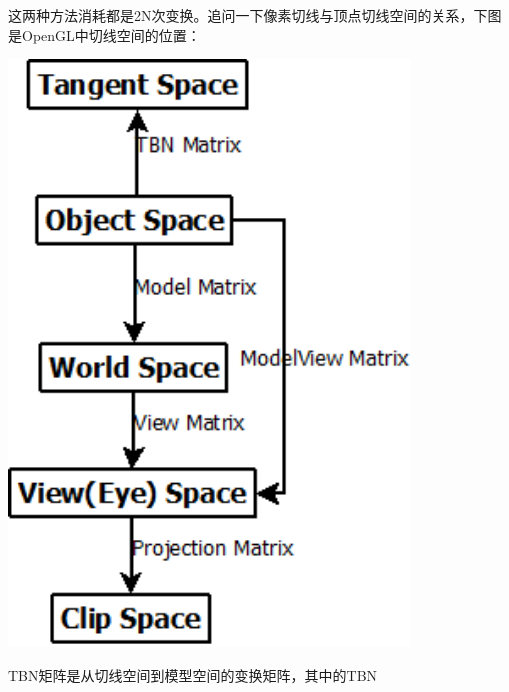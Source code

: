 \par
这两种方法消耗都是2N次变换。追问一下像素切线与顶点切线空间的关系，下图是OpenGL中切线空间的位置：
\begin{center}
    \includegraphics[width=0.8\textwidth,angle=270]{images/ShaderSpace.png}
\end{center}
TBN矩阵是从切线空间到模型空间的变换矩阵，其中的TBN
